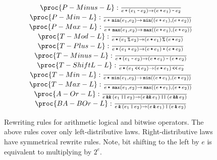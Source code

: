 \begin{figure}[htbp!]
\[
\begin{matrix}
\proc{P-Minus-L}:{\over
e \lp \p{e_1 \lm e_2} \rightarrow \p{e \lp e_1 } \lm e_2
}\\
\proc{P-Min-L}:{\over
e \lp \LMIN\p{e_1, e_2} \rightarrow \LMIN\p{\p{e \lp e_1}, \p{e \lp e_2}}
}\\
\proc{P-Max-L}:{\over
e \lp \LMAX\p{e_1, e_2} \rightarrow \LMAX\p{\p{e \lp e_1}, \p{e \lp e_2}}
}\\
\proc{T-Mod-L}:{\over
e \lt \p{e_1 \lmod e_2}\rightarrow \p{ e \lt e_1 } \lmod \p{ e \lt e_2 }
}\\
\proc{T-Plus-L}:{\over
e \lt \p{e_1 \lp e_2} \rightarrow \p{ e \lt e_1 } \lp \p{ e \lt e_2 }
}\\
\proc{T-Minus-L}:{\over
e \lt \p{e_1 \lm e_2} \rightarrow \p{ e\lt e_1 } \lm \p{ e \lt e_2 }
}\\
\proc{T-ShiftL-L}:{\over
e \lt \p{e_1 \LBSL e_2} \rightarrow \p{ e \lt e_1 } \LBSL e_2
}\\
\proc{T-Min-L}:{\over
e \lt \LMIN\p{e_1, e_2} \rightarrow \LMIN\p{\p{e \lt e_1}, \p{e \lt e_2}}
}\\
\proc{T-Max-L}:{\over
e \lt \LMAX\p{e_1, e_2} \rightarrow \LMAX\p{\p{e \lt e_1}, \p{e \lt e_2}}
}\\
\proc{A-Or-L}:{\over
e \LAND \p{e_1 \LOR e_2}\rightarrow \p{ e \LAND e_1 } \LOR \p{ e \LAND e_2 }
}\\
\proc{BA-BOr-L}:{\over
e \LBAND \p{e_1 \LBOR e_2}\rightarrow \p{ e \LBAND e_1 } \LBOR \p{ e \LBAND e_2
}
}\\
\end{matrix}
\]
\caption[]{Rewriting rules for arithmetic logical and bitwise operators. The
above rules cover only left-distributive laws. Right-distributive laws have
symmetrical rewrite rules.  Note, bit shifting to the left by $e$ is equivalent
to multiplying by $2^e$.}
\label{figure:rewriting}
\end{figure}



